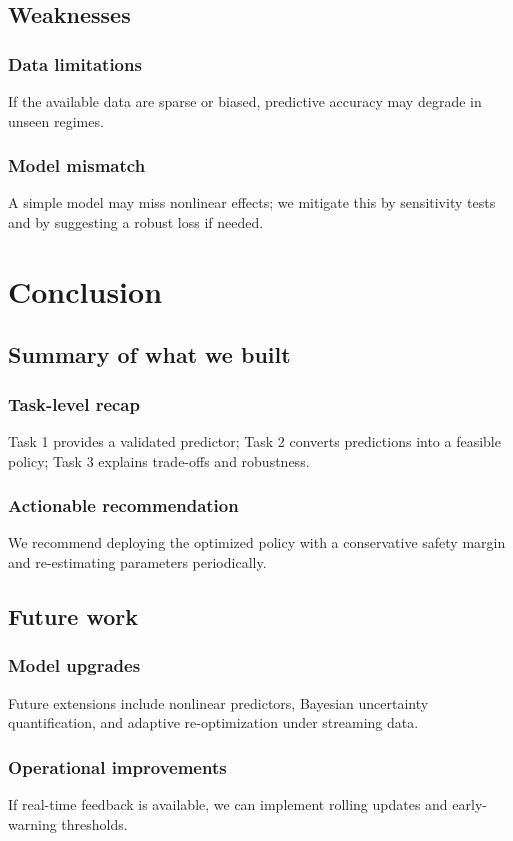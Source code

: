 \documentclass[12pt]{article}
\begin{document}
\subsection{Weaknesses}
\subsubsection{Data limitations}
If the available data are sparse or biased, predictive accuracy may degrade in unseen regimes.

\subsubsection{Model mismatch}
A simple model may miss nonlinear effects; we mitigate this by sensitivity tests and by suggesting a robust loss if needed.

\section{Conclusion}
\subsection{Summary of what we built}
\subsubsection{Task-level recap}
Task 1 provides a validated predictor; Task 2 converts predictions into a feasible policy; Task 3 explains trade-offs and robustness.

\subsubsection{Actionable recommendation}
We recommend deploying the optimized policy with a conservative safety margin and re-estimating parameters periodically.

\subsection{Future work}
\subsubsection{Model upgrades}
Future extensions include nonlinear predictors, Bayesian uncertainty quantification, and adaptive re-optimization under streaming data.

\subsubsection{Operational improvements}
If real-time feedback is available, we can implement rolling updates and early-warning thresholds.
\end{document}

